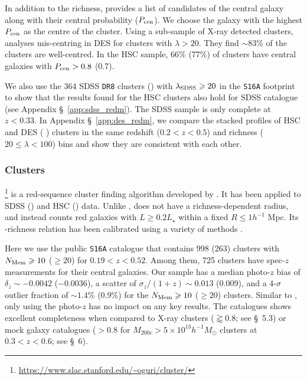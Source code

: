 \documentclass[fleqn,usenatbib,useAMS]{mnras}
\begin{document}
\begin{CJK*}{UTF8}{gbsn}
    In addition to the richness, \redm{} provides a list of candidates of the central galaxy along
    with their central probability ($P_{\rm cen}$).
    We choose the galaxy with the highest $P_{\rm cen}$ as the centre of the cluster.
    Using a sub-sample of X-ray detected clusters, \citet{Zhang2019b} analyses \redm{} mis-centring
    in DES for clusters with $\lambda > 20$. 
    They find $\sim 83$\% of the clusters are well-centred.
    In the HSC \redm{} sample, 66\% (77\%) of clusters have central galaxies with $P_{\rm cen} >
    0.8$ (0.7).

    We also use the 364 SDSS \texttt{DR8} \redm{} clusters (\citealt{Rykoff2014}) with $\lambda_{\rm
    SDSS} \geq 20$ in the \texttt{S16A} footprint to show that the results found for the HSC \redm{}
    clusters also hold for SDSS \redm{} catalogue (see Appendix \S\ \ref{app:sdss_redm}).
    The SDSS sample is only complete at $z < 0.33$.
    In Appendix \S\ \ref{app:des_redm}, we compare the stacked \dsigma{} profiles of HSC and DES
    \redm{} (\eg{} \citealt{Chang2018, McClintock2019}) clusters in the same redshift ($0.2 < z <
    0.5$) and richness ($20 \leq \lambda < 100$) bins and show they are consistent with each other.

\subsubsection{\camira{} Clusters}
    \label{sec:cluster_camira}

    \camira{}\footnote{\url{https://www.slac.stanford.edu/~oguri/cluster/}} is a
    red-sequence cluster finding algorithm developed by \citet{Oguri2014}.
    It has been applied to SDSS (\citealt{Oguri2014}) and HSC (\citealt{Oguri2018}) data.
    Unlike \redm{}, \camira{} does not have a richness-dependent radius, and instead counts red
    galaxies with $L \geq 0.2L_{\star}$ within a fixed $R\leq 1 h^{-1}$ Mpc.
    Its \mvir{}-richness relation has been calibrated using a variety of methods \citep{Murata2019,
    Chiu2020a, Chiu2020b}.

    Here we use the public \texttt{S16A} \camira{} catalogue that contains 998 (263) clusters with
    $N_{\rm Mem} \geq 10$ ($\geq 20$) for $0.19 < z < 0.52$.
    Among them, 725 clusters have spec-$z$ measurements for their central galaxies.
    Our \camira{} sample has a median photo-$z$ bias of $\delta_{z} \sim -0.0042$ ($-0.0036$), a
    scatter of $\sigma_{z}/(1 + z) \sim 0.013$ (0.009), and a 4-$\sigma$ outlier fraction of
    $\sim 1.4$\% (0.9\%) for the $N_{\rm Mem} \geq 10$ ($\geq 20$) clusters.
    Similar to \redm{}, only using the photo-$z$ has no impact on any key results.
    The \camira{} catalogues shows excellent completeness when compared to X-ray clusters
    ($\gtrapprox 0.8$; see \citealt{Oguri2018} \S\ 5.3) or mock galaxy catalogues ($> 0.8$ for
    $M_{200c} > 5 \times 10^{13} h^{-1} M_{\odot}$ clusters at $0.3 < z < 0.6$; see
    \citealt{Oguri2018} \S\ 6).


\end{CJK*}
\end{document}
